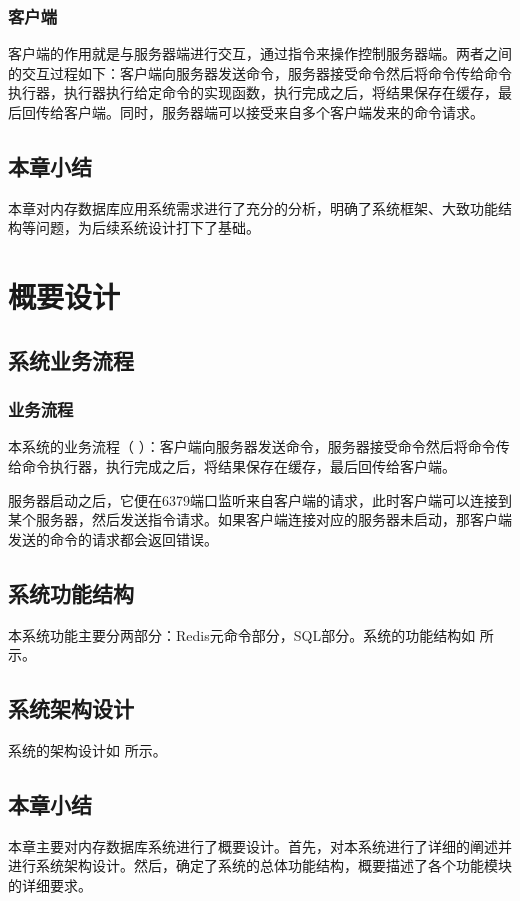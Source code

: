 \documentclass{zjutthesis}
\begin{document}
\subsection{客户端}
客户端的作用就是与服务器端进行交互，通过指令来操作控制服务器端。两者之间的交互过程如下：客户端向服务器发送命令，服务器接受命令然后将命令传给命令执行器，执行器执行给定命令的实现函数，执行完成之后，将结果保存在缓存，最后回传给客户端。同时，服务器端可以接受来自多个客户端发来的命令请求。

\section{本章小结}
本章对内存数据库应用系统需求进行了充分的分析，明确了系统框架、大致功能结构等问题，为后续系统设计打下了基础。


\chapter{概要设计}
\section{系统业务流程}
\subsection{业务流程}
本系统的业务流程（%
）：客户端向服务器发送命令，服务器接受命令然后将命令传给命令执行器，执行完成之后，将结果保存在缓存，最后回传给客户端。

服务器启动之后，它便在6379端口监听来自客户端的请求，此时客户端可以连接到某个服务器，然后发送指令请求。如果客户端连接对应的服务器未启动，那客户端发送的命令的请求都会返回错误。

\section{系统功能结构}
本系统功能主要分两部分：Redis元命令部分，SQL部分。系统的功能结构如
所示。

\section{系统架构设计}
系统的架构设计如%
所示。

\section{本章小结}
本章主要对内存数据库系统进行了概要设计。首先，对本系统进行了详细的阐述并进行系统架构设计。然后，确定了系统的总体功能结构，概要描述了各个功能模块的详细要求。
\end{document}
